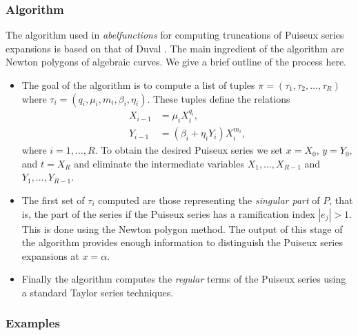 \subsubsection*{Algorithm}

The algorithm used in {\it abelfunctions} for computing truncations of
Puiseux series expansions is based on that of Duval \cite{Duval89}. The
main ingredient of the algorithm are Newton polygons of algebraic
curves. We give a brief outline of the process here.
\begin{itemize}
  \item The goal of the algorithm is to compute a list of tuples $\pi =
    (\tau_1, \tau_2, \ldots, \tau_R)$ where $\tau_i =
    (q_i,\mu_i,m_i,\beta_i,\eta_i)$. These tuples define the relations
    \begin{align*}
      X_{i-1} &= \mu_i X_i^{q_i}, \\
      Y_{i-1} &= (\beta_i + \eta_iY_i)X_i^{m_i},
    \end{align*}
    where $i = 1, \ldots, R$. To obtain the desired Puiseux series we
    set $x = X_0$, $y = Y_0$, and $t = X_R$ and eliminate the
    intermediate variables $X_1,\ldots,X_{R-1}$ and
    $Y_1,\ldots,Y_{R-1}$.
  \item The first set of $\tau_i$ computed are those representing the
    {\it singular part} of $P$, that is, the part of the series if the
    Puiseux series has a ramification index $|e_j|>1$. This is done
    using the Newton polygon method. The output of this stage of the
    algorithm provides enough information to distinguish the Puiseux
    series expansions at $x=\alpha$.
  \item Finally the algorithm computes the {\it regular} terms of the
    Puiseux series using a standard Taylor series techniques.
\end{itemize}

\subsubsection*{Examples}

